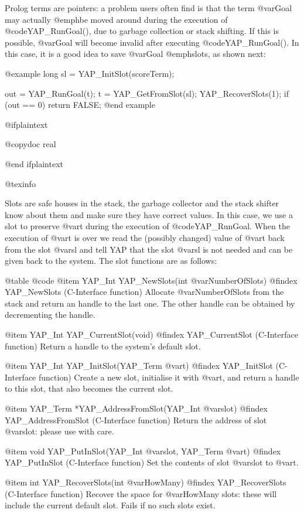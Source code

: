 Prolog terms are pointers: a problem users often find is that the term
@var{Goal} may actually @emph{be moved around} during the execution of
@code{YAP_RunGoal()}, due to garbage collection or stack shifting. If
this is possible, @var{Goal} will become invalid after executing
@code{YAP_RunGoal()}. In this case, it is a good idea to save @var{Goal}
@emph{slots}, as shown next:

@example
  long sl = YAP_InitSlot(scoreTerm);

  out = YAP_RunGoal(t);
  t = YAP_GetFromSlot(sl);
  YAP_RecoverSlots(1);
  if (out == 0) return FALSE;
@end example

@ifplaintext

@copydoc real

@end ifplaintext

@texinfo

Slots are safe houses in the stack, the garbage collector and the stack
shifter know about them and make sure they have correct values. In this
case, we use a slot to preserve @var{t} during the execution of
@code{YAP_RunGoal}. When the execution of @var{t} is over we read the
(possibly changed) value of @var{t} back from the slot @var{sl} and tell
YAP that the slot @var{sl} is not needed and can be given back to the
system. The slot functions are as follows:

@table @code
@item YAP_Int YAP_NewSlots(int @var{NumberOfSlots})
@findex YAP_NewSlots (C-Interface function)
Allocate @var{NumberOfSlots} from the stack and return an handle to the
last one. The other handle can be obtained by decrementing the handle.

@item YAP_Int YAP_CurrentSlot(void)
@findex YAP_CurrentSlot (C-Interface function)
Return a handle to the system's default slot.

@item YAP_Int YAP_InitSlot(YAP_Term @var{t})
@findex YAP_InitSlot (C-Interface function)
Create a new slot, initialise it with @var{t}, and return a handle to
this slot, that also becomes the current slot.

@item YAP_Term *YAP_AddressFromSlot(YAP_Int @var{slot})
@findex YAP_AddressFromSlot (C-Interface function)
Return the address of slot @var{slot}: please use with care.

@item void YAP_PutInSlot(YAP_Int @var{slot}, YAP_Term @var{t})
@findex YAP_PutInSlot (C-Interface function)
Set the contents of slot @var{slot} to @var{t}.

@item int YAP_RecoverSlots(int @var{HowMany})
@findex YAP_RecoverSlots (C-Interface function)
Recover the space for @var{HowMany} slots: these will include the
current default slot. Fails if no such slots exist.

